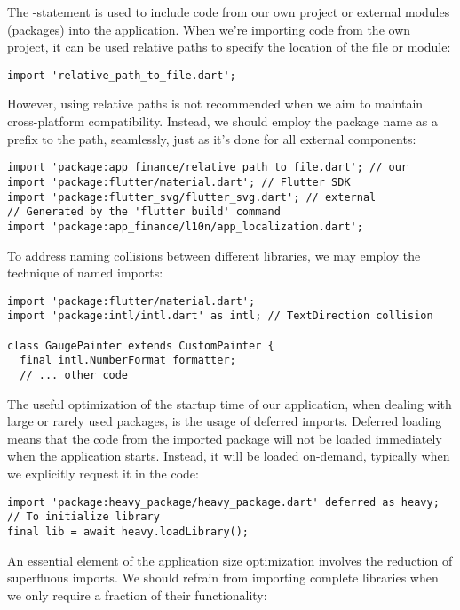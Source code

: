 The -statement is used to include code from our own project or external modules (packages) into the
application. When we're importing code from the own project, it can be used relative paths to specify the location of
the file or module:

\begin{lstlisting}
import 'relative_path_to_file.dart';
\end{lstlisting}

\noindent However, using relative paths is not recommended when we aim to maintain cross-platform compatibility.
Instead, we should employ the package name as a prefix to the path, seamlessly, just as it's done for all external
components:

\begin{lstlisting}
import 'package:app_finance/relative_path_to_file.dart'; // our
import 'package:flutter/material.dart'; // Flutter SDK
import 'package:flutter_svg/flutter_svg.dart'; // external
// Generated by the 'flutter build' command
import 'package:app_finance/l10n/app_localization.dart';
\end{lstlisting}

\noindent To address naming collisions between different libraries, we may employ the technique of named imports:

\begin{lstlisting}
import 'package:flutter/material.dart';
import 'package:intl/intl.dart' as intl; // TextDirection collision

class GaugePainter extends CustomPainter {
  final intl.NumberFormat formatter;
  // ... other code
\end{lstlisting}

\noindent The useful optimization of the startup time of our application, when dealing with large or rarely used
packages, is the usage of deferred imports. Deferred loading means that the code from the imported package will not be
loaded immediately when the application starts. Instead, it will be loaded on-demand, typically when we explicitly
request it in the code:

\begin{lstlisting}
import 'package:heavy_package/heavy_package.dart' deferred as heavy;
// To initialize library
final lib = await heavy.loadLibrary();
\end{lstlisting}

\noindent An essential element of the application size optimization involves the reduction of superfluous imports.
We should refrain from importing complete libraries when we only require a fraction of their functionality:


